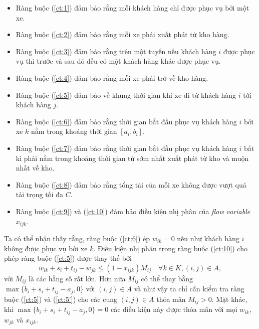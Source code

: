 \begin{itemize}
  \item Ràng buộc (\ref{ct:1}) đảm bảo rằng mỗi khách hàng chỉ được phục vụ bởi một xe.
  \item Ràng buộc (\ref{ct:2}) đảm bảo rằng mỗi xe phải xuất phát từ kho hàng.
  \item Ràng buộc (\ref{ct:3}) đảm bảo rằng trên một tuyến nếu khách hàng $i$ được phục vụ thì trước và sau đó đều có một khách hàng khác được phục vụ.
  \item Ràng buộc (\ref{ct:4}) đảm bảo rằng mỗi xe phải trở về kho hàng.
  \item Ràng buộc (\ref{ct:5}) đảm bảo về khung thời gian khi xe đi từ khách hàng $i$ tới khách hàng $j$.
  \item Ràng buộc (\ref{ct:6}) đảm bảo rằng thời gian bắt đầu phục vụ khách hàng $i$ bởi xe $k$ nằm trong khoảng thời gian $[a_i, b_i]$.
  \item Ràng buộc (\ref{ct:7}) đảm bảo rằng thời gian bắt đầu phục vụ khách hàng $i$ bất kì phải nằm trong khoảng thời gian từ sớm nhất xuất phát từ kho và muộn nhất về kho.
  \item Ràng buộc (\ref{ct:8}) đảm bảo rằng tổng tải của mỗi xe không được vượt quá tải trọng tối đa $C$.
  \item Ràng buộc (\ref{ct:9}) và (\ref{ct:10}) đảm bảo điều kiện nhị phân của \textit{flow variable} $x_{ijk}$.
\end{itemize}

Ta có thể nhận thấy rằng, ràng buộc (\ref{ct:6}) ép $w_{ik} = 0$ nếu như khách hàng $i$ không được phục vụ bởi xe $k$. Điều kiện nhị phân trong ràng buộc (\ref{ct:10}) cho phép ràng buộc (\ref{ct:5}) được thay thế bởi 
\begin{equation}
  \label{ct:5'}
  w_{ik} + s_i + t_{ij} - w_{jk} \leq (1 - x_{ijk}) M_{ij} \quad \forall k \in K, (i,j) \in A,
\end{equation}
với $M_{ij}$ là các hằng số rất lớn. Hơn nữa $M_{ij}$ có thể thay bằng $\max \{b_i + s_i + t_{ij} - a_j, 0\}$ với $(i,j) \in A$ và như vậy ta chỉ cần kiểm tra ràng buộc (\ref{ct:5}) và (\ref{ct:5'}) cho các cung $(i, j) \in A$ thỏa mãn $M_{ij} > 0$. Mặt khác, khi $\max \{b_i + s_i + t_{ij} - a_j, 0\} = 0$ các điều kiện này được thỏa mãn với mọi $w_{ik}$, $w_{jk}$ và $x_{ijk}$.